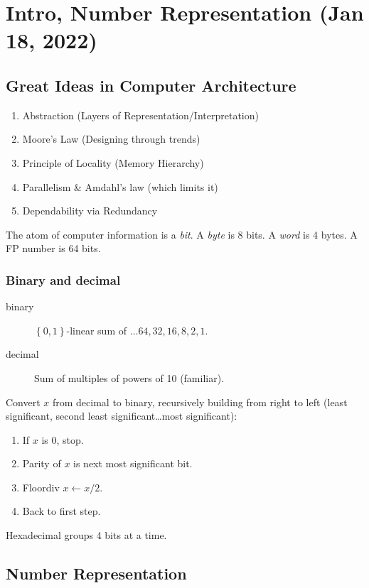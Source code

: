 \chapter{Intro, Number Representation (Jan 18, 2022)}
\section{Great Ideas in Computer Architecture}
\begin{enumerate}
    \item Abstraction (Layers of Representation/Interpretation)
    \item Moore’s Law (Designing through trends)
    \item Principle of Locality (Memory Hierarchy)
    \item Parallelism \& Amdahl's law (which limits it)
    \item Dependability via Redundancy
\end{enumerate}

The atom of computer information is a \emph{bit}.
A \emph{byte} is 8 bits.
A \emph{word} is 4 bytes.
A FP number is 64 bits.

\subsection{Binary and decimal}
\begin{description}
	\item[binary] \(\left\{0,1\right\}\)-linear sum of \(\ldots64, 32, 16, 8, 2, 1\).
	\item[decimal] Sum of multiples of powers of 10 (familiar).
\end{description}

Convert \(x\) from decimal to binary, recursively
building from right to left
(least significant, second least significant\ldots most significant):
\begin{enumerate}
	\item If \(x\) is 0, stop.
	\item Parity of \(x\) is next most significant bit.
	\item Floordiv \(x \leftarrow x/2\).
	\item Back to first step.
\end{enumerate}

Hexadecimal groups 4 bits at a time.

\section{Number Representation}

